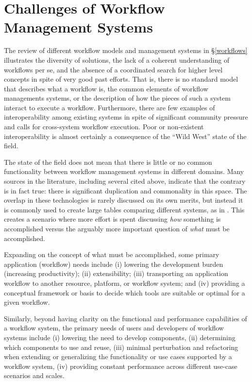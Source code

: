 
\section{Challenges of Workflow Management Systems}\label{commonFunc}

The review of different workflow models and management systems in
\S\ref{workflows} illustrates the diversity of solutions, the lack of a coherent
understanding of workflows per se, and the absence of a coordinated search for
higher level concepts in spite of very good past efforts. That is, there is no
standard model that describes what a workflow is, the common elements of
workflow managements systems, or the description of how the pieces of such a
system interact to execute a workflow. Furthermore, there are few examples of
interoperability among existing systems in spite of significant community
pressure and calls for cross-system workflow execution. Poor or non-existent
interoperability is almost certainly a consequence of the ``Wild West'' state of
the field.

The state of the field does not mean that there is little or no common
functionality between workflow management systems in different domains. Many
sources in the literature, including several cited above, indicate
that the contrary is in fact true: there is significant duplication and
commonality in this space. The overlap in these technologies is rarely discussed
on its own merits, but instead it is commonly used to create large tables
comparing different systems, as in
\cite{ferreira_da_silva_characterization_nodate}. This creates a scenario where
more effort is spent discussing \textit{how} something is accomplished
versus the arguably more important question of \textit{what} must be
accomplished. 

Expanding on the concept of what must be accomplished, some primary application
(workflow) needs include (i) lowering the development burden (increasing
productivity); (ii) extensibility; (iii) transporting an application workflow
to another resource, platform, or workflow system; and (iv) providing a
conceptual framework or basis to decide which tools are suitable or optimal for
a given workflow.

Similarly, beyond having clarity on the functional and performance capabilities of a
workflow system, the primary needs of users and developers of workflow systems
include (i) lowering the need to develop components, (ii) determining which
components to use and reuse, (iii) minimal perturbation and refactoring when
extending or generalizing the functionality or use cases supported by a
workflow system, (iv) providing constant performance across different use-case
scenarios and scales.

